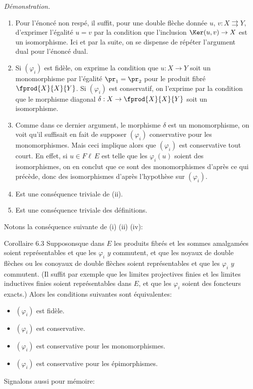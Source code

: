 \noindent \emph{Démonstration.}
\begin{enumerate}
\renewcommand{\theenumi}{\roman{enumi}}
\renewcommand{\labelenumi}{(\theenumi)}
\item Pour l'énoncé non respé, il suffit, pour une double
  flèche donnée $u$, $v:X\rightrightarrows Y$, d'exprimer
  l'égalité $u=v$ par la condition que l'inclusion
  $\Ker(u,v)\rightarrow X$ est un isomorphisme. Ici et par la suite,
  on se dispense de répéter l'argument dual pour l'énoncé
  dual.

\item Si $(\varphi_i)$ est fidèle, on exprime la condition que
  $u:X\rightarrow Y$ soit un monomorphisme par l'égalité
  $\pr_1=\pr_2$ pour le produit fibré $\fprod{X}{X}{Y}$. Si $(\varphi_i)$
  est conservatif, on l'exprime par la condition que le morphisme
  diagonal $\delta:X\rightarrow \fprod{X}{X}{Y}$ soit un isomorphisme.

\setcounter{enumi}{3}
\item Comme dans ce dernier argument, le morphisme $\delta$ est un
  monomorphisme, on voit qu'il suffisait en fait de supposer
  $(\varphi_i)$ conservative pour les monomorphismes. Mais ceci
  implique alors que $(\varphi_i)$ est conservative tout court. En
  effet, si $u\in %
F\ell\,E$ est telle que les $\varphi_i(u)$ soient des
  isomorphismes, on en conclut que ce sont des monomorphismes
  d'après ce qui précède, donc des isomorphismes d'après
  l'hypothèse sur $(\varphi_i)$.

\setcounter{enumi}{2}
\item Est une conséquence triviale de (ii).

\setcounter{enumi}{4}
\item Est une conséquence triviale des définitions.
\end{enumerate}

Notons la conséquence suivante de (i) (ii) (iv):

\begin{enonce*}{Corollaire 6.3}
Supposons\pageoriginale que dans $E$ les produits fibrés et les
sommes amalgamées soient représentables et que les $\varphi_i$ $y$
commutent, et que les noyaux de double flèches ou les conoyaux de
double flèches soient représentables et que les $\varphi_i$ $y$
commutent. (Il suffit par exemple que les limites projectives finies
et les limites inductives finies soient représentables dans $E$, et
que les $\varphi_i$ soient des foncteurs exacts.) Alors les
conditions suivantes sont équivalentes:
\begin{itemize}
\item[a)] $(\varphi_i)$ est fidèle.

\item[b)] $(\varphi_i)$ est conservative.

\item[c)] $(\varphi_i)$ est conservative pour les monomorphismes.

\item[${\rm c')}$] $(\varphi_i)$ est conservative pour les épimorphismes.
\end{itemize}
\end{enonce*}
Signalons aussi pour mémoire:

